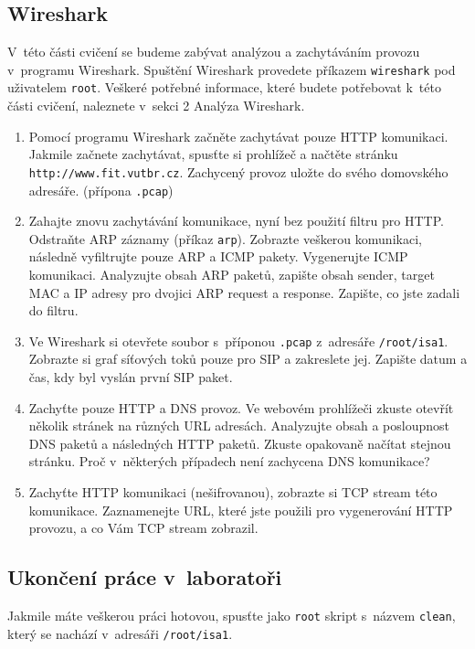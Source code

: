 \subsection{Wireshark}
V~této části cvičení se budeme zabývat analýzou a zachytáváním provozu v~programu Wireshark. Spuštění Wireshark provedete příkazem \texttt{wireshark} pod uživatelem \texttt{root}. Veškeré potřebné informace, které budete potřebovat k~této části cvičení, naleznete v~sekci 2 Analýza Wireshark.

\begin{enumerate}
\item Pomocí programu Wireshark začněte zachytávat pouze HTTP komunikaci. Jakmile začnete zachytávat, spusťte si prohlížeč a načtěte stránku \texttt{http://www.fit.vutbr.cz}. Zachycený provoz uložte do svého domovského adresáře. (přípona \texttt{.pcap})
\item Zahajte znovu zachytávání komunikace, nyní bez použití filtru pro HTTP. Odstraňte ARP záznamy (příkaz \texttt{arp}). Zobrazte veškerou komunikaci, následně vyfiltrujte pouze ARP a ICMP pakety. Vygenerujte ICMP komunikaci. Analyzujte obsah ARP paketů, zapište obsah sender, target MAC a IP adresy pro dvojici ARP request a response. Zapište, co jste zadali do filtru.
\item Ve Wireshark si otevřete soubor s~příponou \texttt{.pcap} z~adresáře \texttt{/root/isa1}. Zobrazte si graf síťových toků pouze pro SIP a zakreslete jej. Zapište datum a čas, kdy byl vyslán první SIP paket.
\item Zachyťte pouze HTTP a DNS provoz. Ve webovém prohlížeči zkuste otevřít několik stránek na různých URL adresách. Analyzujte obsah a posloupnost DNS paketů a následných HTTP paketů. Zkuste opakovaně načítat stejnou stránku. Proč v~některých případech není zachycena DNS komunikace?
\item Zachyťte HTTP komunikaci (nešifrovanou), zobrazte si TCP stream této komunikace. Zaznamenejte URL, které jste použili pro vygenerování HTTP provozu, a co Vám TCP stream zobrazil.
\end{enumerate}

\subsection{Ukončení práce v~laboratoři}
Jakmile máte veškerou práci hotovou, spusťte jako \texttt{root} skript s~názvem \texttt{clean}, který se nachází v~adresáři \texttt{/root/isa1}.
